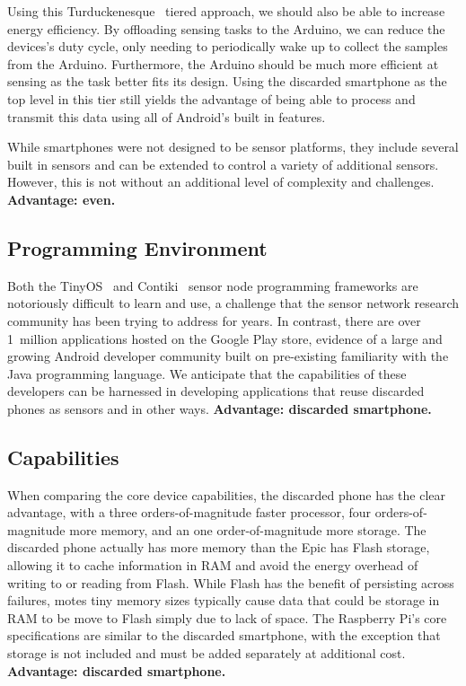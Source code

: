 Using this Turduckenesque~\cite{sorber2005turducken} tiered approach, we should 
also be able to increase energy efficiency. By offloading sensing tasks to the 
Arduino, we can reduce the devices's duty cycle, only needing to periodically 
wake up to collect the samples from the Arduino.  Furthermore, the Arduino should
be much more efficient at sensing as the task better fits its design. Using the 
discarded smartphone as the top level in this tier still yields the advantage of 
being able to process and transmit this data using all of Android's built in features.

While smartphones were not designed to be sensor platforms, they include several
built in sensors and can be extended to control a variety of additional sensors.
However, this is not without an additional level of complexity and challenges. 
\textbf{Advantage: even.}

\subsection{Programming Environment}

Both the TinyOS~\cite{tinyos} and Contiki~\cite{contiki} sensor node
programming frameworks are notoriously difficult to learn and use, a
challenge that the sensor network research community has been trying to
address for years. In contrast, there are over 1~million applications hosted
on the Google Play store, evidence of a large and growing Android developer
community built on pre-existing familiarity with the Java programming
language. We anticipate that the capabilities of these developers can be
harnessed in developing applications that reuse discarded phones as sensors
and in other ways. \textbf{Advantage: discarded smartphone.}

\subsection{Capabilities}

When comparing the core device capabilities, the discarded phone has the
clear advantage, with a three orders-of-magnitude faster processor, four
orders-of-magnitude more memory, and an one order-of-magnitude more storage.
The discarded phone actually has more memory than the Epic has Flash storage,
allowing it to cache information in RAM and avoid the energy overhead of
writing to or reading from Flash. While Flash has the benefit of persisting
across failures, motes tiny memory sizes typically cause data that could be
storage in RAM to be move to Flash simply due to lack of space. The Raspberry
Pi's core specifications are similar to the discarded smartphone, with the
exception that storage is not included and must be added separately at
additional cost. \textbf{Advantage: discarded smartphone.}

